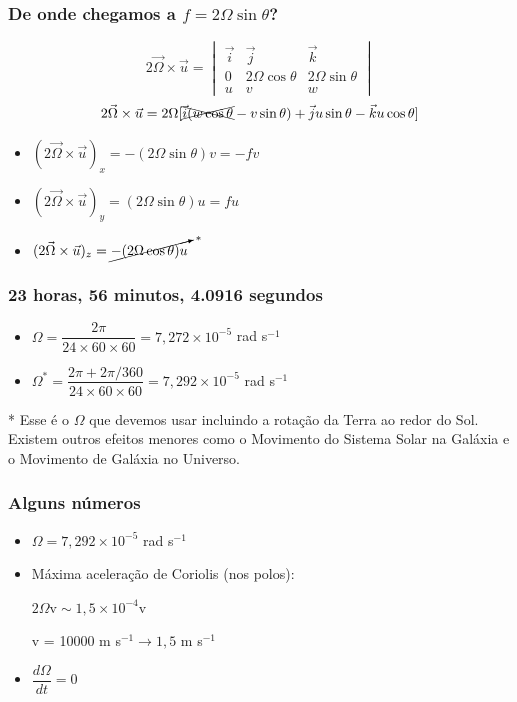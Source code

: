 \begin{frame}
  \frametitle{De onde chegamos a $f = 2\Omega\sin{\theta}$?}
  \[
    2\vec{\Omega} \times \vec{u} =
    \begin{vmatrix}
    \vec{i} & \vec{j}           & \vec{k}\\
    0       & 2\Omega\cos\theta & 2\Omega\sin\theta\\
    u       & v                 & w
    \end{vmatrix}
  \]
  \pause
  \[
    2\vec{\Omega} \times \vec{u} =
    2\Omega [\xcancel{\vec{i}(w\cos\theta} - v\sin\theta) +
             \vec{j}u\sin\theta - \vec{k}u\cos\theta]
  \]
  \pause
  \begin{itemize}
    \item $(2\vec{\Omega} \times \vec{u})_x = -(2\Omega\sin\theta)v = -fv$
    \item $(2\vec{\Omega} \times \vec{u})_y = (2\Omega\sin\theta)u = fu$
    \item $(2\vec{\Omega} \times \vec{u})_z = \cancelto{*}{-(2\Omega\cos\theta)u}$
  \end{itemize}
\end{frame}


\begin{frame}
  \frametitle{23 horas, 56 minutos, 4.0916 segundos}
  \begin{itemize}[<+-| alert@+>]
    \item $\Omega = \dfrac{2\pi} {24 \times 60 \times 60} =
           7,272 \times 10^{-5}$ rad s$^{-1}$
    \item $\Omega^* = \dfrac{2\pi + 2\pi/360} {24 \times 60 \times 60} =
           7,292 \times 10^{-5}$ rad s$^{-1}$
  \end{itemize}
  \pause
  \small{* Esse é o $\Omega$ que devemos usar incluindo a rotação da Terra ao
         redor do Sol.  Existem outros efeitos menores como o Movimento do
         Sistema Solar na Galáxia e o Movimento de Galáxia no Universo.}
\end{frame}

\begin{frame}
  \frametitle{Alguns números}
  \begin{itemize}[<+-| alert@+>]
    \item $\Omega = 7,292 \times 10^{-5}$ rad s$^{-1}$
    \item Máxima aceleração de Coriolis (nos polos):

        $2\Omega \text{v} \sim 1,5 \times 10^{-4}\text{v}$

        v = 10000 m s$^{-1}  \rightarrow 1,5$ m s$^{-1}$
    \item $\dfrac{d\Omega}{dt} = 0$
  \end{itemize}
\end{frame}


